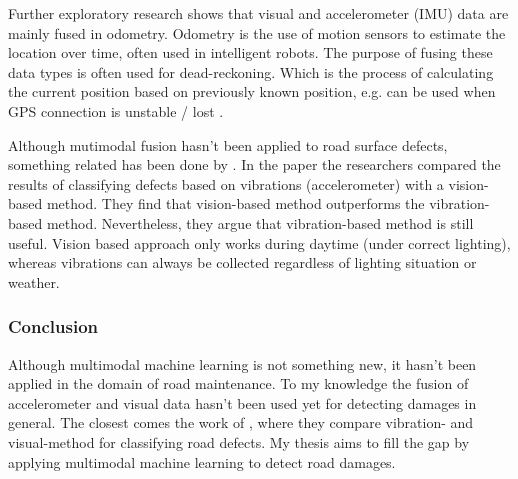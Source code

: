 Further exploratory research shows that visual and accelerometer (IMU) data are mainly fused in odometry. Odometry is the use of motion sensors to estimate the location over time, often used in intelligent robots. The purpose of fusing these data types is often used for dead-reckoning. Which is the process of calculating the current position based on previously known position, e.g. can be used when GPS connection is unstable / lost \cite{Jiang2017,Brossard2020}.

Although mutimodal fusion hasn't been applied to road surface defects, something related has been done by . In the paper the researchers compared the results of classifying defects based on vibrations (accelerometer) with a vision-based method. They find that vision-based method outperforms the vibration-based method. Nevertheless, they argue that vibration-based method is still useful. Vision based approach only works during daytime (under correct lighting), whereas vibrations can always be collected regardless of lighting situation or weather.

\subsubsection{Conclusion}
Although multimodal machine learning is not something new, it hasn't been applied in the domain of road maintenance. To my knowledge the fusion of accelerometer and visual data hasn't been used yet for detecting damages in general. The closest comes the work of , where they compare vibration- and visual-method for classifying road defects. My thesis aims to fill the gap by applying multimodal machine learning to detect road damages. 




